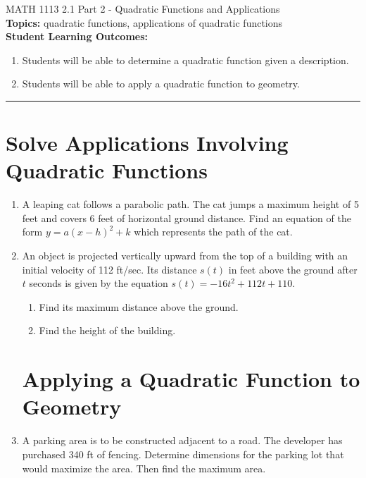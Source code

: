 \documentclass[11pt]{article}
\begin{document}
\noindent MATH 1113   \hfill 2.1 Part 2 - Quadratic Functions and Applications\\



\noindent \textbf{Topics:}  quadratic functions, applications of quadratic functions\\

\noindent \textbf{Student Learning Outcomes:}
\begin{enumerate}
\item Students will be able to determine a quadratic function given a description.
\item Students will be able to apply a quadratic function to geometry.
\end{enumerate}

\hrule 
\vspace{5mm}
\section{Solve Applications Involving Quadratic Functions}


\begin{enumerate}
\item A leaping cat follows a parabolic path. The cat jumps a maximum height of 5 feet and covers 6 feet of horizontal ground distance. Find an equation of the form $y = a(x-h)^2+k$ which represents the path of the cat. \vfill

\item An object is projected vertically upward from the top of a building with an initial velocity of 112 ft/sec. Its distance $s(t)$ in feet above the ground after $t$ seconds is given by the equation $s(t)=-16t^2 + 112t + 110.$
\begin{enumerate}
\item Find its maximum distance above the ground.
\item Find the height of the building.
\end{enumerate}

\vfill



\newpage


\section{Applying a Quadratic Function to Geometry}


\item A parking area is to be constructed adjacent to a road.  The developer has purchased 340 ft of fencing.  Determine dimensions for the parking lot that would maximize the area.  Then find the maximum area.


\vfill



\end{enumerate}
\end{document}
